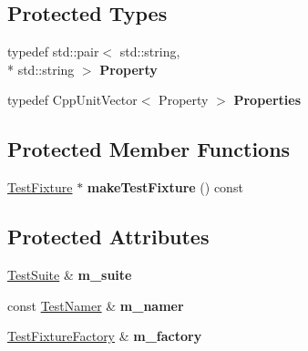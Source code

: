 \subsection*{Protected Types}
\begin{DoxyCompactItemize}
\item 
\hypertarget{class_test_suite_builder_context_base_a1e2319a53ecd7a718c87f4ea5c42d4c6}{typedef std\-::pair$<$ std\-::string, \\*
std\-::string $>$ {\bfseries Property}}\label{class_test_suite_builder_context_base_a1e2319a53ecd7a718c87f4ea5c42d4c6}

\item 
\hypertarget{class_test_suite_builder_context_base_a95565394a60a8b8d843a5a64d2572a86}{typedef Cpp\-Unit\-Vector$<$ Property $>$ {\bfseries Properties}}\label{class_test_suite_builder_context_base_a95565394a60a8b8d843a5a64d2572a86}

\end{DoxyCompactItemize}
\subsection*{Protected Member Functions}
\begin{DoxyCompactItemize}
\item 
\hypertarget{class_test_suite_builder_context_base_a5474060095c1ab76f16a133af0fb3b52}{\hyperlink{class_test_fixture}{Test\-Fixture} $\ast$ {\bfseries make\-Test\-Fixture} () const }\label{class_test_suite_builder_context_base_a5474060095c1ab76f16a133af0fb3b52}

\end{DoxyCompactItemize}
\subsection*{Protected Attributes}
\begin{DoxyCompactItemize}
\item 
\hypertarget{class_test_suite_builder_context_base_a16ea2e4d82cd9f94b843839dc8ed2931}{\hyperlink{class_test_suite}{Test\-Suite} \& {\bfseries m\-\_\-suite}}\label{class_test_suite_builder_context_base_a16ea2e4d82cd9f94b843839dc8ed2931}

\item 
\hypertarget{class_test_suite_builder_context_base_abdbbb982c6c41ae8ecc5abe954c56e70}{const \hyperlink{class_test_namer}{Test\-Namer} \& {\bfseries m\-\_\-namer}}\label{class_test_suite_builder_context_base_abdbbb982c6c41ae8ecc5abe954c56e70}

\item 
\hypertarget{class_test_suite_builder_context_base_ad814ae6df45822300bf99dfcee0277f7}{\hyperlink{class_test_fixture_factory}{Test\-Fixture\-Factory} \& {\bfseries m\-\_\-factory}}\label{class_test_suite_builder_context_base_ad814ae6df45822300bf99dfcee0277f7}

\end{DoxyCompactItemize}


